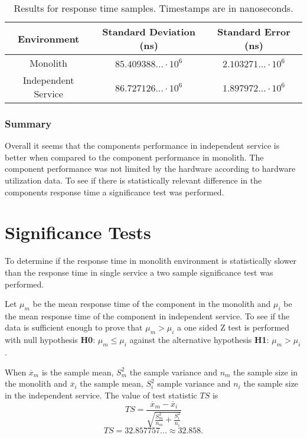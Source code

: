 \begin{table}[h!]
    \begin{tabular}{|c|c|c|} 
        \hline
        Environment
        & Standard Deviation (ns)
        & Standard Error (ns) \\ [0.5ex] 
        
        \hline\hline
        Monolith
        & $85.409388... \cdot 10^6$
        & $2.103271... \cdot 10^6$ \\ 
        
        Independent Service
        & $86.727126... \cdot 10^6$
        & $1.897972... \cdot 10^6$ \\ 
         \hline
    \end{tabular}
    \caption{Results for response time samples. Timestamps are in nanoseconds.}
    \label{table:response time results:3}
\end{table}

\subsubsection{Summary}
Overall it seems that the components performance in independent service is better when compared to the component performance in monolith.
The component performance was not limited by the hardware according to hardware utilization data.
To see if there is statistically relevant difference in the components response time a significance test was performed.

\section{Significance Tests}
To determine if the response time in monolith environment is statistically slower than the response time in single service a two sample significance test was performed.

Let $\mu_m$ be the mean response time of the component in the monolith and $\mu_i$ be the mean response time of the component in independent service.
To see if the data is sufficient enough to prove that $\mu_m > \mu_i$ a one sided Z test is performed with null hypothesis \textbf{H0}: $\mu_m \leq \mu_i$ against the alternative hypothesis \textbf{H1}: $\mu_m > \mu_i$.

When $\overline{x}_m$ is the sample mean, $S_m^2$ the sample variance and $n_m$ the sample size in the monolith 
and $\overline{x}_i$ the sample mean, $S_i^2$ sample variance and $n_i$ the sample size in the independent service.
The value of test statistic $TS$ is
\[
TS=\frac{\overline{x}_m-\overline{x}_i}{\sqrt{\frac{S_m^2}{n_m}+\frac{S_i^2}{n_i}}}
\]
\[
TS=32.857757... \approx 32.858
.\]
 
